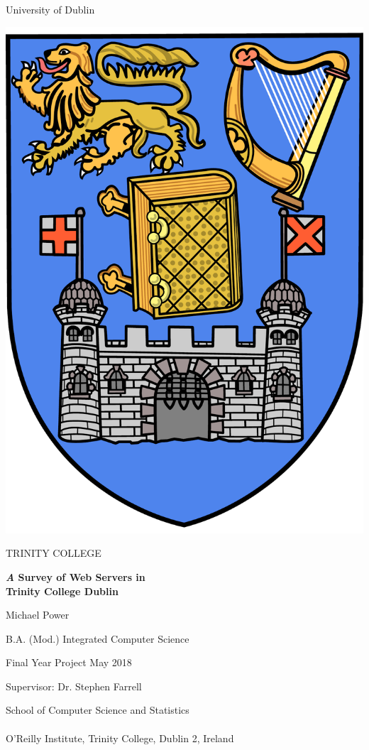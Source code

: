 \documentclass[a4wide,leqno,12pt]{report}
\begin{document}
\bgroup %
\linespread{0}
\thispagestyle{empty}
\begin{center}
{\sffamily
{\Large University of Dublin}

\vspace{10pt}

\includegraphics[scale=0.12]{images/trinitycollege.pdf}

\vspace{10pt}

{\Huge TRINITY COLLEGE}

\vspace{80pt}

\textbf{ \Large \emph A Survey of Web Servers in\\ Trinity College Dublin}

\vspace{30pt}

Michael Power

B.A. (Mod.) Integrated Computer Science

Final Year Project May 2018

Supervisor: Dr. Stephen Farrell

\vspace{110pt}

\large{School of Computer Science and Statistics
\\$ $\\
O'Reilly Institute, Trinity College, Dublin 2, Ireland}
\linespread{1}
}
\end{center}
\egroup %
\end{document}
